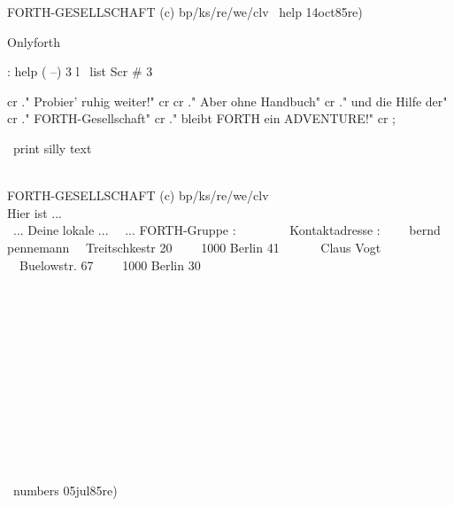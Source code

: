                                          
                                         
FORTH-GESELLSCHAFT  (c) bp/ks/re/we/clv 
\ help                        14oct85re) 
                                         
Onlyforth                                
                                         
: help  ( --)                            
 3 l                \ list Scr # 3       
                                         
 cr ." Probier' ruhig weiter!" cr        
 cr ." Aber ohne Handbuch"               
 cr ." und die Hilfe der"                
 cr ." FORTH-Gesellschaft"               
 cr ." bleibt FORTH ein ADVENTURE!" cr ; 
                                         
       \ print silly text                
                                         
                                         
                                         
                                         
                                         
                                         
                                         
                                         
\\                                       
                                         
FORTH-GESELLSCHAFT  (c) bp/ks/re/we/clv 
\\ Hier ist  ...                      \\ 
\      ... Deine lokale ...            \ 
\           ... FORTH-Gruppe :         \ 
\                                      \ 
\                                      \ 
\                                      \ 
\           Kontaktadresse :           \ 
\                                      \ 
\           bernd  pennemann           \ 
\           Treitschkestr 20           \ 
\                                      \ 
\           1000  Berlin  41           \ 
\                                      \ 
\                                      \ 
\           Claus     Vogt             \ 
\           Buelowstr.  67             \ 
\                                      \ 
\           1000 Berlin 30             \ 
\                                      \ 
\                                      \ 
\                                      \ 
\                                      \ 
\                                      \ 
\                                      \ 
\\ \\ \\ \\ \\ \\  \\  \\ \\ \\ \\ \\ \\
\ numbers                     05jul85re) 
                                         
